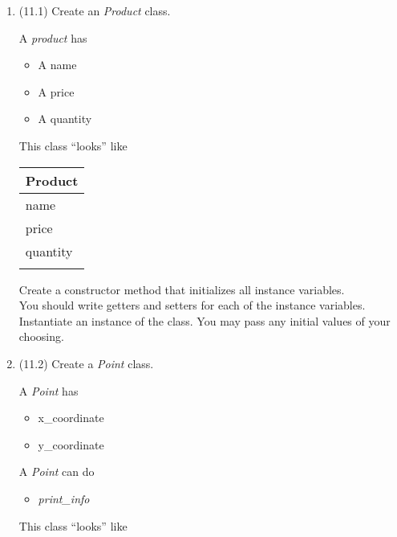 \documentclass{article}
\begin{document}
\begin{enumerate}
\item (11.1) Create an \textit{Product} class.\\
	\begin{minipage}{.6\textwidth}
		A \textit{product} has
		\begin{itemize}
			\item A name
			\item A price
			\item A quantity	
		\end{itemize}
	\end{minipage} 
	\begin{minipage}{.4\textwidth}
		This class ``looks'' like 
				
		\vspace*{1em}
		\begin{tabular}{|l|}
			\hline Product\\ \hline
			name\\ price\\ quantity\\ \hline
			\\  \hline
		\end{tabular}
	\end{minipage}

	\vspace*{2ex}
	Create a constructor method that initializes all instance variables.\\
	You should write getters and setters for each of the instance variables.\\
	Instantiate an instance of the class. You may pass any initial values of your choosing.

\item (11.2) Create a \textit{Point} class.\\
	\begin{minipage}{.6\textwidth}		
		A \textit{Point} has
		\begin{itemize}
			\item x\_coordinate 
			\item y\_coordinate 
		\end{itemize}

		A \textit{Point} can do
		\begin{itemize}
			\item \textit{print\_info}
		\end{itemize}
	\end{minipage}
	\begin{minipage}{.4\textwidth}
		This class ``looks'' like 
				

\end{minipage}
\end{enumerate}
\end{document}
